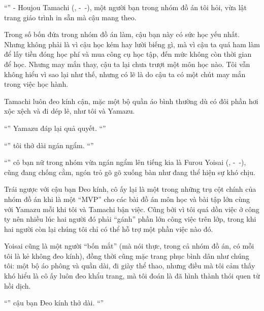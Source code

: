 \documentclass[../main.tex]{subfiles}
\begin{document}
``'' - Houjou Tamachi (, -\ -), một người bạn trong nhóm đồ án tôi hỏi, vừa lật trang giáo trình in sẵn mà cậu mang theo.

Trong số bốn đứa trong nhóm đồ án làm, cậu bạn này có sức học yếu nhất. Nhưng không phải là vì cậu học kém hay lười biếng gì, mà vì cậu ta quá ham làm để lấy tiền đóng học phí và mua công cụ học tập, đến mức không còn thời gian để học. Nhưng may mắn thay, cậu ta lại chưa trượt một môn học nào. Tôi vẫn không hiểu vì sao lại như thế, nhưng có lẽ là do cậu ta có một chút may mắn trong việc học hành.

Tamachi luôn đeo kính cận, mặc một bộ quần áo bình thường dù có đôi phần hơi xộc xệch và đi dép lê, như tôi và Yamazu.

``'' Yamazu đáp lại quả quyết. ``''

``'' tôi thở dài ngán ngẩm. ``''

``'' cô bạn nữ trong nhóm vừa ngán ngẩm lên tiếng kia là Furou Yoisai (, -\ -), cũng đang chống cằm, ngón trỏ gõ gõ xuống bàn như đang thể hiện sự khó chịu.

Trái ngược với cậu bạn Đeo kính, cô ấy lại là một trong những trụ cột chính của nhóm đồ án khi là một ``MVP'' cho các bài đồ án môn học và bài tập lớn cùng với Yamazu mỗi khi tôi và Tamachi bận việc. Cũng bởi vì tôi quá dồn việc ở công ty nên nhiều lúc hai người đó phải ``gánh'' phần lớn công việc trên lớp, trong khi hai người còn lại chúng tôi chỉ có thể hỗ trợ một phần việc nào đó.

Yoisai cũng là một người ``bốn mắt'' (mà nói thực, trong cả nhóm đồ án, có mỗi tôi là kẻ không đeo kính), đồng thời cũng mặc trang phục bình dân như chúng tôi: một bộ áo phông và quần dài, đi giày thể thao, nhưng điều mà tôi cảm thấy khó hiểu là cô ấy luôn đeo khẩu trang, mà tôi đoán là đã hình thành thói quen từ hồi dịch.

``'' cậu bạn Đeo kính thở dài. ``''
\end{document}
